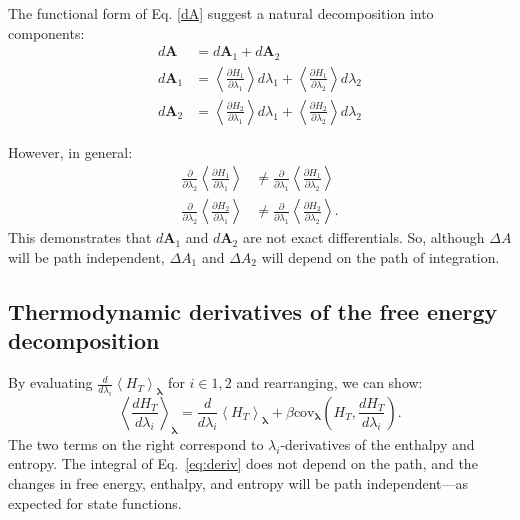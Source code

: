 \documentclass[%
 preprint,
 amsmath,amssymb,
 aps,
]{revtex4-1}
\renewcommand{\vec}[1]{{\bm{#1}}}
\begin{document}
The functional form of Eq. \ref{dA} suggest a natural decomposition into components:
\begin{align}
d\vec A &= d\vec A_1 + d\vec A_2 \\
d\vec A_1 &= 
\left< \frac{\partial H_1}{\partial \lambda_1} \right> d\lambda_1 +
\left< \frac{\partial H_1}{\partial \lambda_2} \right> d\lambda_2 \\
d\vec A_2 &= 
\left< \frac{\partial H_2}{\partial \lambda_1} \right> d\lambda_1 +
\left< \frac{\partial H_2}{\partial \lambda_2} \right> d\lambda_2
\end{align}

However, in general:
\begin{align}
\frac{\partial}{\partial \lambda_2}\left<\frac{\partial H_1}{\partial \lambda_1}\right>
&\neq
\frac{\partial}{\partial \lambda_1}\left<\frac{\partial H_1}{\partial \lambda_2}\right>\\
\frac{\partial}{\partial \lambda_2}\left<\frac{\partial H_2}{\partial \lambda_1}\right>
&\neq
\frac{\partial}{\partial \lambda_1}\left<\frac{\partial H_2}{\partial \lambda_2}\right>.
\end{align}
This demonstrates that $d\vec A_1$ and $d\vec A_2$ are not exact differentials. So, although $\Delta A$ will be path independent, $\Delta A_1$ and $\Delta A_2$ will depend on the path of integration.

\subsection{Thermodynamic derivatives of the free energy decomposition}
\label{s:CumulantDerv}

By evaluating $\frac{d}{d\lambda_i}\left<H_T\right>_{\vec\lambda}$ for $i \in {1, 2}$ and rearranging, we can show:
\begin{equation}
\left<\frac{dH_T}{d\lambda_i}\right>_{\vec\lambda} = 
\frac{d}{d\lambda_i}\left<H_T\right>_{\vec\lambda} +
\beta \mathrm{cov}_{\vec\lambda}\left(H_T, \frac{dH_T}{d\lambda_i} \right).
\label{eq:deriv}
\end{equation}
The two terms on the right correspond to $\lambda_i$-derivatives of the enthalpy and entropy. The integral of Eq.~\ref{eq:deriv} does not depend on the path, and the changes in free energy, enthalpy, and entropy will be path independent---as expected for state functions.
\end{document}
